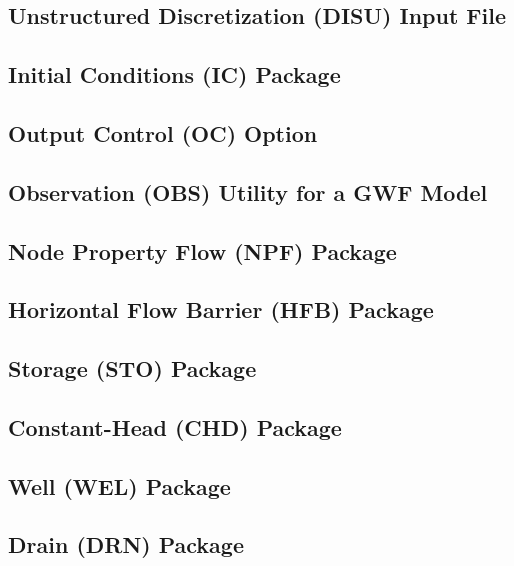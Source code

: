 \newpage
\subsection{Unstructured Discretization (DISU) Input File}


\newpage
\subsection{Initial Conditions (IC) Package}


\newpage
\subsection{Output Control (OC) Option}


\newpage
\subsection{Observation (OBS) Utility for a GWF Model}


\newpage
\subsection{Node Property Flow (NPF) Package}


\newpage
\subsection{Horizontal Flow Barrier (HFB) Package}


\newpage
\subsection{Storage (STO) Package}


\newpage
\subsection{Constant-Head (CHD) Package}


\newpage
\subsection{Well (WEL) Package}


\newpage
\subsection{Drain (DRN) Package}


